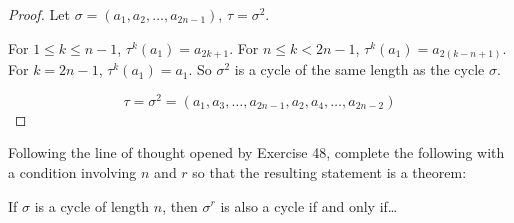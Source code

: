 \begin{proof}
    Let $\sigma = (a_{1}, a_{2}, \ldots, a_{2n-1})$, $\tau = \sigma^{2}$.

    For $1\leq k \leq n-1$, $\tau^{k}(a_{1}) = a_{2k+1}$. For $n\leq k < 2n-1$, $\tau^{k}(a_{1}) = a_{2(k-n+1)}$. For $k = 2n-1$, $\tau^{k}(a_{1}) = a_{1}$. So $\sigma^{2}$ is a cycle of the same length as the cycle $\sigma$.

    \[
        \tau = \sigma^{2} = (a_{1}, a_{3}, \ldots, a_{2n-1}, a_{2}, a_{4}, \ldots, a_{2n-2})
    \]
\end{proof}

\begin{exercise}
    Following the line of thought opened by Exercise 48, complete the following with a condition involving $n$ and $r$ so that the resulting statement is a theorem:
    \begin{center}
        If $\sigma$ is a cycle of length $n$, then $\sigma^{r}$ is also a cycle if and only if\ldots
    \end{center}
\end{exercise}

